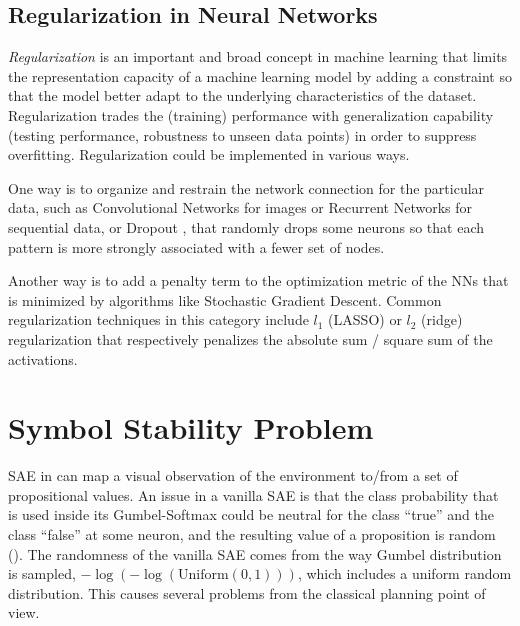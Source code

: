 \subsection{Regularization in Neural Networks}

\emph{Regularization} is an important and broad concept in machine learning
that limits the representation capacity of a machine learning model by adding a constraint
so that the model better adapt to the underlying characteristics of the dataset.
Regularization trades the (training) performance with generalization capability (testing performance, robustness to
unseen data points) in order to suppress overfitting.
Regularization could be implemented in various ways.

One way is to organize and restrain the network connection for the particular data,
such as Convolutional Networks for images
or Recurrent Networks for sequential data, or
Dropout \cite{srivastava2014dropout}, that randomly drops some neurons so
that each pattern is more strongly associated with a fewer set of nodes.

Another way is to add a penalty term to the optimization metric of the
NNs that is minimized by algorithms like Stochastic
Gradient Descent.
Common regularization techniques in this category include
$l_1$ (LASSO) or $l_2$ (ridge) regularization that respectively penalizes the absolute sum / square sum of the
activations.



\section{Symbol Stability Problem}
\label{issues}

SAE in \latentplanner can map a visual observation of the environment to/from a set of propositional values.
An issue in a vanilla SAE is that the class probability that is used inside its Gumbel-Softmax could be
neutral for the class ``true'' and the class ``false'' at some neuron, and the resulting value
of a proposition is random ().
The randomness of the vanilla SAE comes from the way
Gumbel distribution is sampled, $-\log (-\log (\text{Uniform}(0,1)))$, which includes
a uniform random distribution.
This causes several problems from the classical planning point of view.


